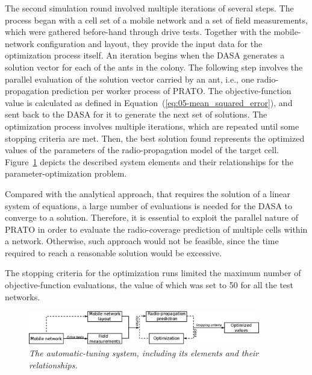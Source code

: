 The second simulation round involved multiple iterations of several
steps. The process began with a cell set of a mobile network and a
set of field measurements, which were gathered before-hand through
drive tests. Together with the mobile-network configuration and layout,
they provide the input data for the optimization process itself. An
iteration begins when the DASA generates a solution vector for each
of the ants in the colony. The following step involves the parallel
evaluation of the solution vector carried by an ant, i.e., one radio-propagation
prediction per worker process of PRATO. The objective-function value
is calculated as defined in Equation~(\ref{eq:05-mean_squared_error}),
and sent back to the DASA for it to generate the next set of solutions.
The optimization process involves multiple iterations, which are repeated
until some stopping criteria are met. Then, the best solution found
represents the optimized values of the parameters of the radio-propagation
model of the target cell. Figure~\ref{fig:05-PRATO_architecture_optimization}
depicts the described system elements and their relationships for
the parameter-optimization problem.

Compared with the analytical approach, that requires the solution
of a linear system of equations, a large number of evaluations is
needed for the DASA to converge to a solution. Therefore, it is essential
to exploit the parallel nature of PRATO in order to evaluate the radio-coverage
prediction of multiple cells within a network. Otherwise, such approach
would not be feasible, since the time required to reach a reasonable
solution would be excessive.

The stopping criteria for the optimization runs limited the maximum
number of objective-function evaluations, the value of which was set
to 50 for all the test networks.

\begin{figure}
\centering

\includegraphics[width=0.9\textwidth]{05-framework_parameter_tuning/img/process_diagram}

\caption{\textit{\emph{The automatic-tuning system, including its elements
and their relationships. \label{fig:05-PRATO_architecture_optimization}}}}
\end{figure}



